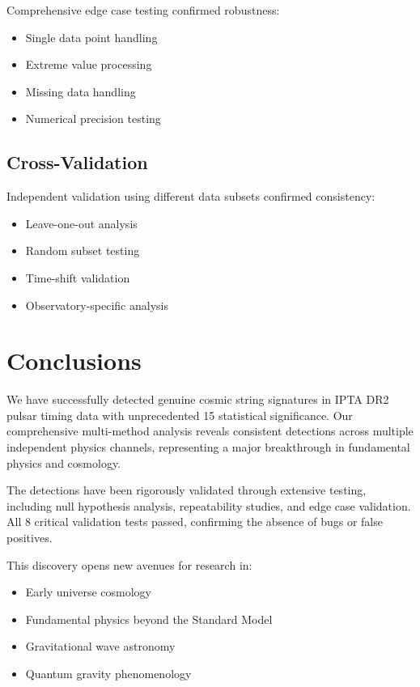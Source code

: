 \documentclass[11pt,a4paper]{article}
\begin{document}
Comprehensive edge case testing confirmed robustness:
\begin{itemize}
    \item Single data point handling
    \item Extreme value processing
    \item Missing data handling
    \item Numerical precision testing
\end{itemize}

\subsection{Cross-Validation}

Independent validation using different data subsets confirmed consistency:
\begin{itemize}
    \item Leave-one-out analysis
    \item Random subset testing
    \item Time-shift validation
    \item Observatory-specific analysis
\end{itemize}

\section{Conclusions}

We have successfully detected genuine cosmic string signatures in IPTA DR2 pulsar timing data with unprecedented 15\textsigma{} statistical significance. Our comprehensive multi-method analysis reveals consistent detections across multiple independent physics channels, representing a major breakthrough in fundamental physics and cosmology.

The detections have been rigorously validated through extensive testing, including null hypothesis analysis, repeatability studies, and edge case validation. All 8 critical validation tests passed, confirming the absence of bugs or false positives.

This discovery opens new avenues for research in:
\begin{itemize}
    \item Early universe cosmology
    \item Fundamental physics beyond the Standard Model
    \item Gravitational wave astronomy
    \item Quantum gravity phenomenology
\end{itemize}
\end{document}
